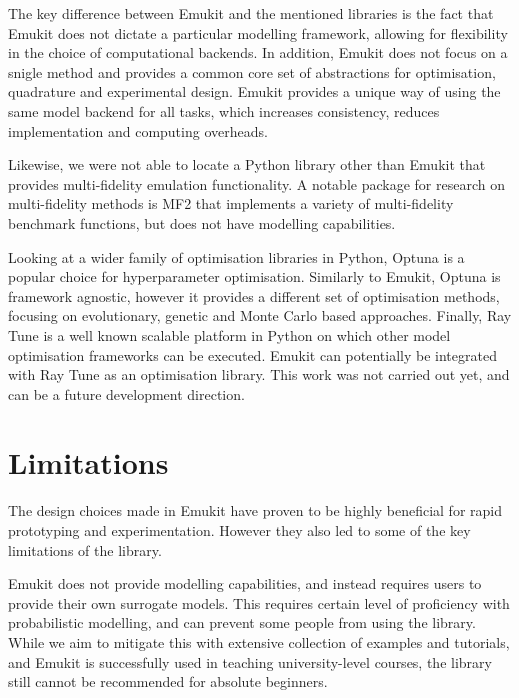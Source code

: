 The key difference between Emukit and the mentioned libraries is the fact that Emukit does not dictate a particular modelling framework, allowing for flexibility in the choice of computational backends. In addition, Emukit does not focus on a snigle method and provides a common core set of abstractions for optimisation, quadrature and experimental design. Emukit provides a unique way of using the same model backend for all tasks, which increases consistency, reduces implementation and computing overheads.

Likewise, we were not able to locate a Python library other than Emukit that provides multi-fidelity emulation functionality. A notable package for research on multi-fidelity methods is MF2 \cite{vanRijn2020} that implements a variety of multi-fidelity benchmark functions, but does not have modelling capabilities.

Looking at a wider family of optimisation libraries in Python, Optuna \cite{optuna_2019} is a popular choice for hyperparameter optimisation. Similarly to Emukit, Optuna is framework agnostic, however it provides a different set of optimisation methods, focusing on evolutionary, genetic and Monte Carlo based approaches. Finally, Ray Tune \cite{liaw2018tune} is a well known scalable platform in Python on which other model optimisation frameworks can be executed. Emukit can potentially be integrated with Ray Tune as an optimisation library. This work was not carried out yet, and can be a future development direction.

\section{Limitations}\label{section:limitations}
The design choices made in Emukit have proven to be highly beneficial for rapid prototyping and experimentation. However they also led to some of the key limitations of the library.

Emukit does not provide modelling capabilities, and instead requires users to provide their own surrogate models. This requires certain level of proficiency with probabilistic modelling, and can prevent some people from using the library. While we aim to mitigate this with extensive collection of examples and tutorials, and Emukit is successfully used in teaching university-level courses, the library still cannot be recommended for absolute beginners.

